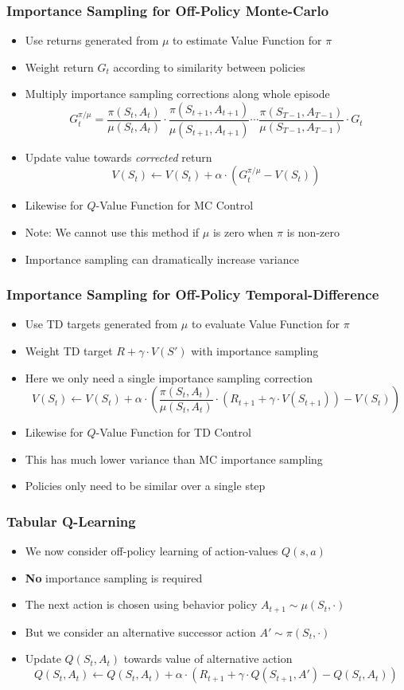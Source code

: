 \documentclass[handout]{beamer}
\begin{document}
\begin{frame}
\frametitle{Importance Sampling for Off-Policy Monte-Carlo}
\pause
\begin{itemize}[<+->]
\item Use returns generated from $\mu$ to estimate Value Function for $\pi$
\item Weight return $G_t$ according to similarity between policies
\item Multiply importance sampling corrections along whole episode
$$G_t^{\pi / \mu} = \frac {\pi(S_t, A_t)} {\mu(S_t, A_t)} \cdot  \frac {\pi(S_{t+1}, A_{t+1})} {\mu(S_{t+1}, A_{t+1})} \cdots \frac {\pi(S_{T-1}, A_{T-1})} {\mu(S_{T-1}, A_{T-1})} \cdot G_t$$
\item Update value towards {\em corrected} return
$$V(S_t) \leftarrow V(S_t) + \alpha \cdot (G_t^{\pi / \mu} - V(S_t))$$
\item Likewise for $Q$-Value Function for MC Control
\item Note: We cannot use this method if $\mu$ is zero when $\pi$ is non-zero
\item Importance sampling can dramatically increase variance
\end{itemize}
\end{frame}

\begin{frame}
\frametitle{Importance Sampling for Off-Policy Temporal-Difference}
\pause
\begin{itemize}[<+->]
\item  Use TD targets generated from $\mu$ to evaluate Value Function for $\pi$
\item Weight TD target $R + \gamma \cdot V(S')$ with importance sampling
\item Here we only need a single importance sampling correction
$$V(S_t) \leftarrow V(S_t) + \alpha \cdot ( \frac {\pi(S_t, A_t)} {\mu(S_t, A_t)} \cdot (R_{t+1} + \gamma \cdot V(S_{t+1})) - V(S_t))$$
\item Likewise for $Q$-Value Function for TD Control
\item This has much lower variance than MC importance sampling
\item Policies only need to be similar over a single step
\end{itemize}
\end{frame}

\begin{frame}
\frametitle{Tabular Q-Learning}
\pause
\begin{itemize}[<+->]
\item We now consider off-policy learning of action-values $Q(s,a)$
\item {\bf No} importance sampling is required
\item The next action is chosen using behavior policy $A_{t+1} \sim \mu(S_t,\cdot)$
\item But we consider an alternative successor action $A' \sim \pi(S_t, \cdot)$
\item Update $Q(S_t, A_t)$ towards value of alternative action
$$Q(S_t, A_t) \leftarrow Q(S_t, A_t) + \alpha \cdot (R_{t+1} + \gamma \cdot Q(S_{t+1}, A') - Q(S_t, A_t))$$ 
\end{itemize}
\end{frame}
\end{document}
